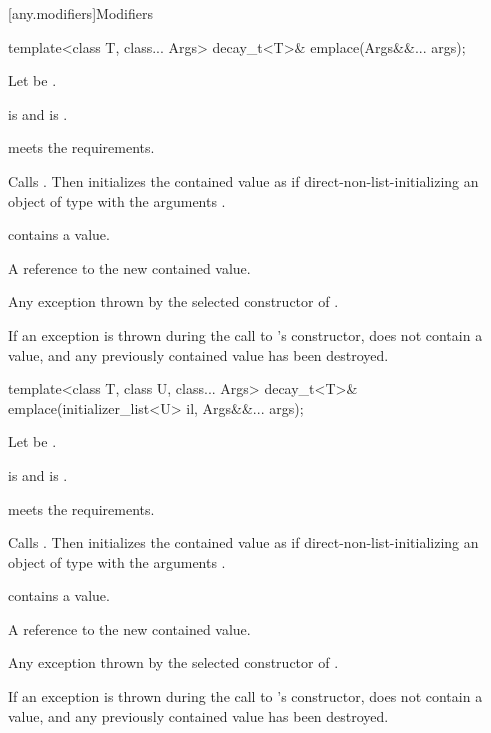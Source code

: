 [any.modifiers]{Modifiers}

%
\begin{itemdecl}
template<class T, class... Args>
  decay_t<T>& emplace(Args&&... args);
\end{itemdecl}

\begin{itemdescr}
\pnum
Let  be .

\pnum
\constraints
{} is  and
 is .

\pnum
\expects
{} meets the  requirements.

\pnum
\effects
Calls .
Then initializes the contained value as if direct-non-list-initializing
an object of type  with the arguments .

\pnum
\ensures
{} contains a value.

\pnum
\returns
A reference to the new contained value.

\pnum
\throws
Any exception thrown by the selected constructor of .

\pnum
\remarks
If an exception is thrown during the call to 's constructor,
 does not contain a value, and any previously contained value
has been destroyed.
\end{itemdescr}

%
\begin{itemdecl}
template<class T, class U, class... Args>
  decay_t<T>& emplace(initializer_list<U> il, Args&&... args);
\end{itemdecl}

\begin{itemdescr}
\pnum
Let  be .

\pnum
\constraints
{} is  and
 is .

\pnum
\expects
{} meets the  requirements.

\pnum
\effects
Calls . Then initializes the contained value
as if direct-non-list-initializing an object of type  with the arguments
.

\pnum
\ensures
{} contains a value.

\pnum
\returns
A reference to the new contained value.

\pnum
\throws
Any exception thrown by the selected constructor of .

\pnum
\remarks
If an exception is thrown during the call to 's constructor,
 does not contain a value, and any previously contained value
has been destroyed.
\end{itemdescr}

